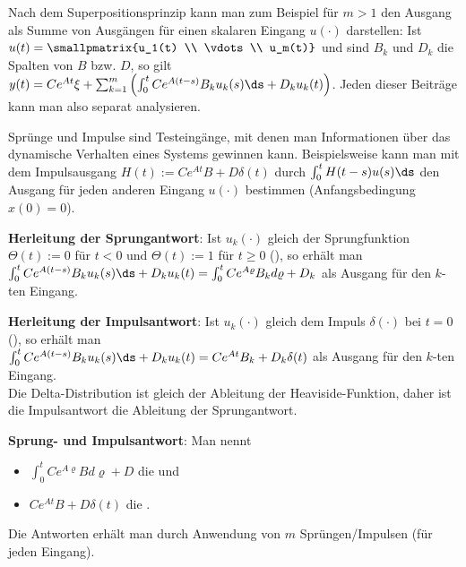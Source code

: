 Nach dem Superpositionsprinzip kann man zum Beispiel für $m > 1$ den Ausgang als Summe
von Ausgängen für einen skalaren Eingang $u(\cdot)$ darstellen:
Ist $u(t) = \smallpmatrix{u_1(t) \\ \vdots \\ u_m(t)}$ und sind $B_k$ und $D_k$ die Spalten
von $B$ bzw. $D$, so gilt
$y(t) = C e^{At} \xi + \sum_{k=1}^m \left(\int_0^t Ce^{A(t-s)} B_k u_k(s)\ds + D_k u_k(t)\right)$.
Jeden dieser Beiträge kann man also separat analysieren.

\linie
\pagebreak

Sprünge und Impulse sind Testeingänge, mit denen man Informationen
über das dynamische Verhalten eines Systems gewinnen kann.
Beispielsweise kann man mit dem Impulsausgang $H(t) := Ce^{At}B + D\delta(t)$
durch $\int_0^t H(t - s) u(s) \ds$ den Ausgang für jeden anderen Eingang
$u(\cdot)$ bestimmen (Anfangsbedingung $x(0) = 0$).

\textbf{Herleitung der Sprungantwort}:
Ist $u_k(\cdot)$ gleich der Sprungfunktion $\Theta(t) := 0$ für $t < 0$ und
$\Theta(t) := 1$ für $t \ge 0$
(), so erhält man\\
$\int_0^t Ce^{A(t-s)} B_k u_k(s)\ds + D_k u_k(t) = \int_0^t Ce^{A\varrho} B_k d\varrho + D_k$
als Ausgang für den $k$-ten Eingang.

\textbf{Herleitung der Impulsantwort}:
Ist $u_k(\cdot)$ gleich dem Impuls $\delta(\cdot)$ bei $t = 0$
(), so erhält man\\
$\int_0^t Ce^{A(t-s)} B_k u_k(s)\ds + D_k u_k(t) = Ce^{At}B_k + D_k \delta(t)$
als Ausgang für den $k$-ten Eingang.\\
Die Delta-Distribution ist gleich der Ableitung der Heaviside-Funktion,
daher ist die Impulsantwort die Ableitung der Sprungantwort.

\textbf{Sprung- und Impulsantwort}:
Man nennt
\begin{itemize}
    \item
    $\int_0^t Ce^{A\varrho}B d\varrho + D$ die  und
    
    \item
    $C e^{At} B + D \delta(t)$ die .
\end{itemize}
Die Antworten erhält man durch Anwendung von $m$ Sprüngen/Impulsen (für jeden Eingang).

\linie

